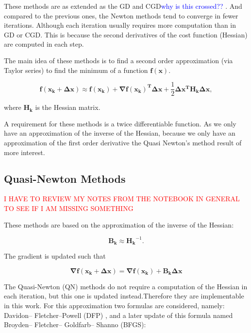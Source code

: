 These methods are as extended as the GD and CGD\textcolor{blue}{why is this crossed?? }. And compared to the previous ones, the Newton methods tend to converge in fewer iterations. Although each iteration usually requires more computation than  in GD or CGD. This is because the second derivatives of the cost function (Hessian) are computed in each step. 

The main idea of these methods is to find a second order approximation (via Taylor series) to find the minimum of a function $\mathbf{f(x)}$.


\begin{equation}
\mathbf{f(x_k + \Delta x) }\approx \mathbf{f(x_k) } + \mathbf{\nabla f(x_k)^{T} }\mathbf{\Delta x} + \frac{1}{2} \mathbf{\Delta x^{T} }\mathbf{H_k} \mathbf{\Delta x},
\end{equation}

where $\mathbf{H_k}$ is the Hessian matrix.
 
A requirement for these methods is a twice differentiable function. 
As we only have an approximation of the inverse of the Hessian, because we only have an approximation of the first order derivative the Quasi Newton's method result of more interest.


\subsection{Quasi-Newton Methods}
\label{subsec:quasinewton}

\textcolor{red}{I HAVE TO REVIEW MY NOTES FROM THE NOTEBOOK IN GENERAL TO SEE IF I AM MISSING SOMETHING	}
 
These methods are based on the approximation of the inverse of the Hessian:

\begin{equation}
\mathbf{B_k} \approx \mathbf{H_k}^{-1}. 
\end{equation}

The gradient is updated such that

\begin{equation}
\mathbf{\nabla f(x_k + \Delta x)} = \mathbf{\nabla f(x_k) + \mathbf{B_k}\mathbf{ \Delta x }} 
\end{equation}



The Quasi-Newton (QN) methods do not require a computation of the Hessian in each iteration, but this one is updated instead.Therefore they are implementable in this work.
For this approximation two formulas are considered, namely: Davidon–
Fletcher–Powell (DFP) \cite{DFP}, and a later update of this formula named Broyden– Fletcher– Goldfarb– Shanno (BFGS)\cite{BFGS}:

